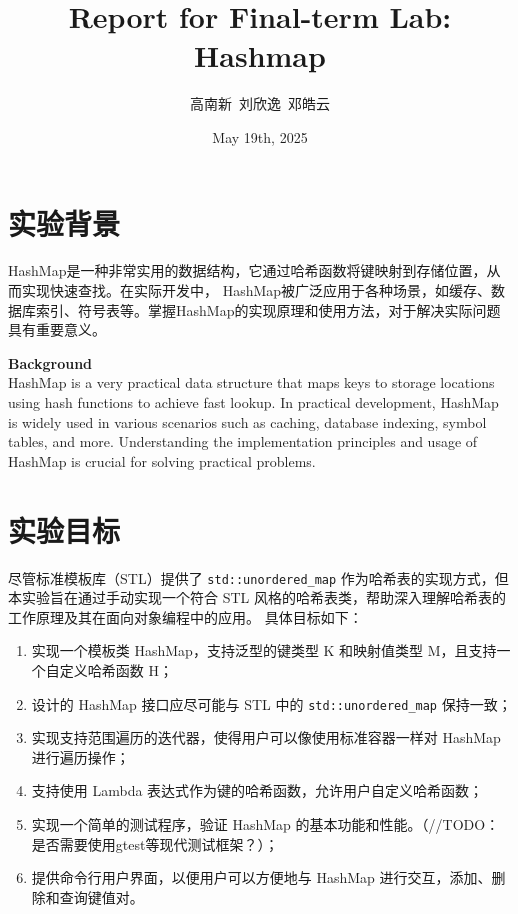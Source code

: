\documentclass{article}
\begin{document}
\title{Report for Final-term Lab: Hashmap}
\author{高南新\ 刘欣逸\ 邓皓云}
\date{May 19th, 2025}
\maketitle

\section{实验背景}
HashMap是一种非常实用的数据结构，它通过哈希函数将键映射到存储位置，从而实现快速查找。在实际开发中，
HashMap被广泛应用于各种场景，如缓存、数据库索引、符号表等。掌握HashMap的实现原理和使用方法，对于解决实际问题具有重要意义。

\bigskip
\textbf{Background}\\
HashMap is a very practical data structure that maps keys to storage locations using hash functions to achieve fast lookup. In practical development, HashMap is widely used in various scenarios such as caching, database indexing, symbol tables, and more. Understanding the implementation principles and usage of HashMap is crucial for solving practical problems.

\section{实验目标}
    尽管标准模板库（STL）提供了 \texttt{std::unordered\_map} 作为哈希表的实现方式，但本实验旨在通过手动实现一个符合 STL 风格的哈希表类，帮助深入理解哈希表的工作原理及其在面向对象编程中的应用。
    具体目标如下：
    \begin{enumerate}
        \item 实现一个模板类 HashMap，支持泛型的键类型 K 和映射值类型 M，且支持一个自定义哈希函数 H；
        \item 设计的 HashMap 接口应尽可能与 STL 中的 \texttt{std::unordered\_map} 保持一致；
        \item 实现支持范围遍历的迭代器，使得用户可以像使用标准容器一样对 HashMap 进行遍历操作；
        \item 支持使用 Lambda 表达式作为键的哈希函数，允许用户自定义哈希函数；
        \item 实现一个简单的测试程序，验证 HashMap 的基本功能和性能。（//TODO：是否需要使用gtest等现代测试框架？）；
        \item 提供命令行用户界面，以便用户可以方便地与 HashMap 进行交互，添加、删除和查询键值对。
    \end{enumerate}
\end{document}
